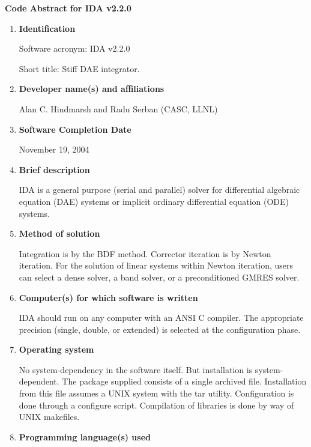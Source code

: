 \documentclass[12pt]{letter}
\begin{document}
\pagestyle{empty}

\begin{letter}

\vspace{0.2in}
\centerline{\bf Code Abstract for IDA v2.2.0}

\begin{enumerate}

\item {\bf Identification}

Software acronym: IDA v2.2.0

Short title: Stiff DAE integrator.

\item {\bf Developer name(s) and affiliations}

Alan C. Hindmarsh and Radu Serban (CASC, LLNL)

\item {\bf Software Completion Date}

November 19, 2004

\item {\bf Brief description}

IDA is a general purpose (serial and parallel) solver for differential algebraic
equation (DAE) systems or implicit ordinary differential equation (ODE) systems.

\item {\bf Method of solution}

Integration is by the BDF method. Corrector iteration is by Newton iteration. 
For the solution of linear systems within Newton iteration, users can select a 
dense solver, a band solver, or a preconditioned GMRES solver.

\item {\bf Computer(s) for which software is written}

IDA should run on any computer with an ANSI C compiler. The appropriate 
precision (single, double, or extended) is selected at the configuration phase.

\item {\bf Operating system}

No system-dependency in the software itself. But installation is system-dependent. 
The package supplied consists of a single archived file. Installation from this file 
assumes a UNIX system with the tar utility. Configuration is done through a 
configure script. Compilation of libraries is done by way of UNIX makefiles.

\item {\bf Programming language(s) used}


\end{enumerate}
\end{letter}
\end{document}
